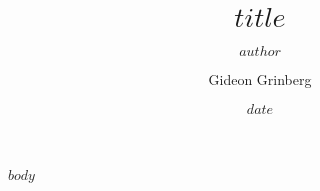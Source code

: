\documentclass[mla8]{mla}
\title{$title$}
\author{$author$}
\author{Gideon Grinberg}
\date{$date$}
\date{\mladate}
\begin{document}
\begin{paper}

$body$

\end{paper}
\end{document}
